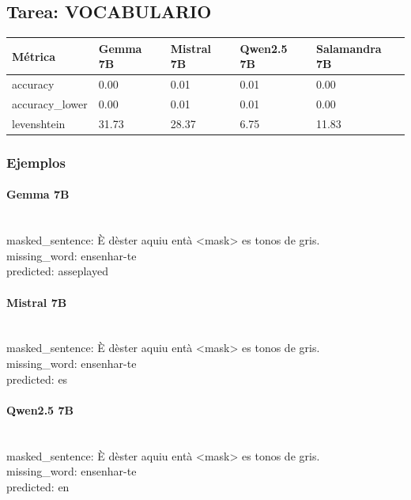 \subsection{Tarea: VOCABULARIO}\label{tarea-vocabulario}
{\def\LTcaptype{none}
\begin{longtable}[]{@{}lllll@{}}
\toprule\noalign{}
Métrica & Gemma 7B & Mistral 7B & Qwen2.5 7B & Salamandra 7B \\
\midrule\noalign{}
\endhead
\bottomrule\noalign{}
\endlastfoot
accuracy & 0.00 & 0.01 & 0.01 & 0.00 \\
accuracy\_lower & 0.00 & 0.01 & 0.01 & 0.00 \\
levenshtein & 31.73 & 28.37 & 6.75 & 11.83 \\
\end{longtable}}

\subsubsection{Ejemplos}

\paragraph{Gemma 7B}~\\
{masked\_sentence:} È d\textquotesingle{}èster aquiu entà {\textless}mask{\textgreater} es tonos de gris.\\
{missing\_word:} ensenhar-te\\
{predicted:} asseplayed\\

\paragraph{Mistral 7B}~\\
{masked\_sentence:} È d\textquotesingle{}èster aquiu entà {\textless}mask{\textgreater} es tonos de gris.\\
{missing\_word:} ensenhar-te\\
{predicted:} es\\

\paragraph{Qwen2.5 7B}~\\
{masked\_sentence:} È d\textquotesingle{}èster aquiu entà {\textless}mask{\textgreater} es tonos de gris.\\
{missing\_word:} ensenhar-te\\
{predicted:} en\\

